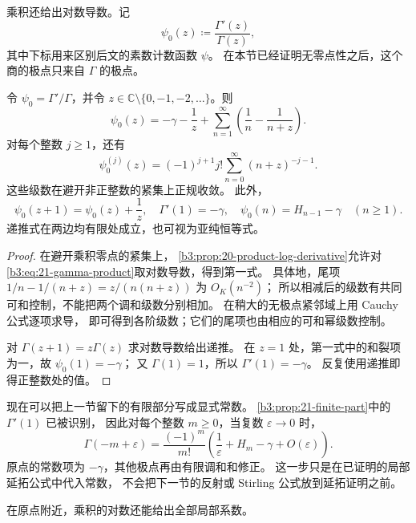 \ProseParagraphBreak
乘积还给出对数导数。记
\[
 \psi_0(z)\coloneqq\frac{\Gamma'(z)}{\Gamma(z)},
\]
其中下标用来区别后文的素数计数函数 \(\psi\)。
在本节已经证明无零点性之后，这个商的极点只来自 \(\Gamma\) 的极点。

\begin{proposition}\label{b3:prop:21-log-derivative}
令 \(\psi_0=\Gamma'/\Gamma\)，并令
\(z\in\mathbb C\setminus\{0,-1,-2,\ldots\}\)。则
\[
 \psi_0(z)=-\gamma-\frac1z+
       \sum_{n=1}^\infty\left(\frac1n-\frac1{n+z}\right).
\]
对每个整数 \(j\ge1\)，还有
\[
 \psi_0^{(j)}(z)=(-1)^{j+1}j!
        \sum_{n=0}^\infty(n+z)^{-j-1}.
\]
这些级数在避开非正整数的紧集上正规收敛。
此外，
\[
 \psi_0(z+1)=\psi_0(z)+\frac1z,\quad
 \Gamma'(1)=-\gamma,\quad
 \psi_0(n)=H_{n-1}-\gamma\quad(n\ge1).
\]
递推式在两边均有限处成立，也可视为亚纯恒等式。
\end{proposition}
\begin{proof}
在避开乘积零点的紧集上，
\cref{b3:prop:20-product-log-derivative}允许对
\eqref{b3:eq:21-gamma-product}取对数导数，得到第一式。
具体地，尾项
\(1/n-1/(n+z)=z/(n(n+z))\) 为 \(O_K(n^{-2})\)；
所以相减后的级数有共同可和控制，不能把两个调和级数分别相加。
在稍大的无极点紧邻域上用 Cauchy 公式逐项求导，
即可得到各阶级数；它们的尾项也由相应的可和幂级数控制。

对 \(\Gamma(z+1)=z\Gamma(z)\) 求对数导数给出递推。
在 \(z=1\) 处，第一式中的和裂项为一，故 \(\psi_0(1)=-\gamma\)；
又 \(\Gamma(1)=1\)，所以 \(\Gamma'(1)=-\gamma\)。
反复使用递推即得正整数处的值。
\end{proof}

现在可以把上一节留下的有限部分写成显式常数。
\cref{b3:prop:21-finite-part}中的 \(\Gamma'(1)\) 已被识别，
因此对每个整数 \(m\ge0\)，当复数 \(\varepsilon\to0\) 时，
\begin{equation}\label{b3:eq:21-pole-finite-part}
 \Gamma(-m+\varepsilon)
 =\frac{(-1)^m}{m!}
   \left(\frac1\varepsilon+H_m-\gamma+O(\varepsilon)\right).
\end{equation}
原点的常数项为 \(-\gamma\)，其他极点再由有限调和和修正。
这一步只是在已证明的局部延拓公式中代入常数，
不会把下一节的反射或 Stirling 公式放到延拓证明之前。

\ProseParagraphBreak
在原点附近，乘积的对数还能给出全部局部系数。


